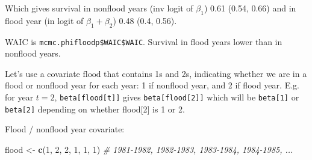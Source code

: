 \documentclass[
  12pt,
]{krantz}
\newenvironment{Shaded}{\begin{snugshade}}{\end{snugshade}}
\newcommand{\CommentTok}[1]{\textcolor[rgb]{0.56,0.35,0.01}{\textit{#1}}}
\newcommand{\DecValTok}[1]{\textcolor[rgb]{0.00,0.00,0.81}{#1}}
\newcommand{\FunctionTok}[1]{\textcolor[rgb]{0.13,0.29,0.53}{\textbf{#1}}}
\newcommand{\NormalTok}[1]{#1}
\newcommand{\OtherTok}[1]{\textcolor[rgb]{0.56,0.35,0.01}{#1}}
\begin{document}
Which gives survival in nonflood years (inv logit of \(\beta_1\)) 0.61 (0.54, 0.66) and in flood year (in logit of \(\beta_1+\beta_2\)) 0.48 (0.4, 0.56).

WAIC is \texttt{mcmc.phifloodp\$WAIC\$WAIC}. Survival in flood years lower than in nonflood years.

Let's use a covariate \(\text{flood}\) that contains 1s and 2s, indicating whether we are in a flood or nonflood year for each year: 1 if nonflood year, and 2 if flood year. E.g. for year \(t = 2\), \texttt{beta{[}flood{[}t{]}{]}} gives \texttt{beta{[}flood{[}2{]}{]}} which will be \texttt{beta{[}1{]}} or \texttt{beta{[}2{]}} depending on whether flood{[}2{]} is 1 or 2.

Flood / nonflood year covariate:

\begin{Shaded}
\begin{Highlighting}[]
\NormalTok{flood }\OtherTok{\textless{}{-}} \FunctionTok{c}\NormalTok{(}\DecValTok{1}\NormalTok{, }\DecValTok{2}\NormalTok{, }\DecValTok{2}\NormalTok{, }\DecValTok{1}\NormalTok{, }\DecValTok{1}\NormalTok{, }\DecValTok{1}\NormalTok{) }\CommentTok{\# 1981{-}1982, 1982{-}1983, 1983{-}1984, 1984{-}1985, ...}
\end{Highlighting}
\end{Shaded}
\end{document}
